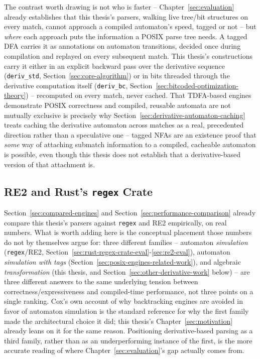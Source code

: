 The contrast worth drawing is not who is faster -- Chapter~\ref{sec:evaluation}
already establishes that this thesis's parsers, walking live tree/bit
structures on every match, cannot approach a compiled automaton's speed,
tagged or not -- but \emph{where} each approach puts the information a
POSIX parse tree needs. A tagged DFA carries it as annotations on
automaton transitions, decided once during compilation and replayed on
every subsequent match. This thesis's constructions carry it either in an
explicit backward pass over the derivative sequence
(\texttt{deriv\_std}, Section~\ref{sec:core-algorithm}) or in bits
threaded through the derivative computation itself
(\texttt{deriv\_bc}, Section~\ref{sec:bitcoded-optimization-theory}) --
recomputed on every match, never cached. That TDFA-based engines
demonstrate POSIX correctness and compiled, reusable automata are not
mutually exclusive is precisely why
Section~\ref{sec:derivative-automaton-caching} treats caching the
derivative automaton across matches as a real, precedented direction
rather than a speculative one -- tagged NFAs are an existence proof that
\emph{some} way of attaching submatch information to a compiled,
cacheable automaton is possible, even though this thesis does not
establish that a derivative-based version of that attachment is.

\subsection{RE2 and Rust's \texttt{regex} Crate}
\label{sec:automaton-engines-related-work}

Section~\ref{sec:compared-engines} and Section~\ref{sec:performance-comparison}
already compare this thesis's parsers against \texttt{regex} and RE2
empirically, on real numbers. What is worth adding here is the
conceptual placement those numbers do not by themselves argue for: three
different families -- automaton \emph{simulation}
(\texttt{regex}/RE2, Section~\ref{sec:rust-regex-crate-eval}-\ref{sec:re2-eval}),
automaton \emph{simulation with tags}
(Section~\ref{sec:posix-engines-related-work}), and algebraic
\emph{transformation} (this thesis, and
Section~\ref{sec:other-derivative-work} below) -- are three different
answers to the same underlying tension between correctness/expressiveness
and compiled-time performance, not three points on a single ranking.
Cox's own account of why backtracking engines are avoided in favor of
automaton simulation \citep{cox2007} is the standard reference for why
the first family made the architectural choice it did; this thesis's
Chapter~\ref{sec:motivation} already leans on it for the same reason.
Positioning derivative-based parsing as a third family, rather than as an
underperforming instance of the first, is the more accurate reading of
where Chapter~\ref{sec:evaluation}'s gap actually comes from.

